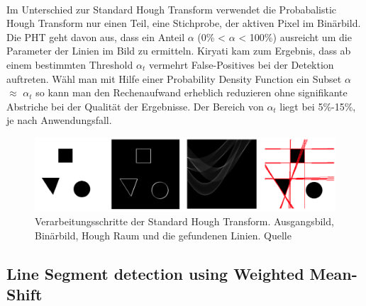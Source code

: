 \paragraph{}
Im Unterschied zur Standard Hough Transform verwendet die Probabalistic Hough Transform nur einen Teil, eine Stichprobe, der aktiven Pixel im Binärbild. Die PHT geht davon aus, dass ein Anteil $\alpha$ (0\% < $\alpha$ < 100\%) ausreicht um die Parameter der Linien im Bild zu ermitteln. Kiryati kam zum Ergebnis, dass ab einem bestimmten Threshold $\alpha_t$ vermehrt False-Positives bei der Detektion auftreten. Wähl man mit Hilfe einer Probability Density Function ein Subset $\alpha$ $\approx$ $\alpha_t$ so kann man den Rechenaufwand erheblich reduzieren ohne signifikante Abstriche bei der Qualität der Ergebnisse. Der Bereich von $\alpha_t$ liegt bei 5\%-15\%, je nach Anwendungsfall.

\begin{figure}[!ht]
\centering
\includegraphics[scale=0.25]{images/hough-transform} 
\caption{Verarbeitungsschritte der Standard Hough Transform. Ausgangsbild, Binärbild, Hough Raum und die gefundenen Linien. Quelle \cite{kiryati}}
\label{fig:hough-transform}
\end{figure}

\pagebreak

\subsection{Line Segment detection using Weighted Mean-Shift}

